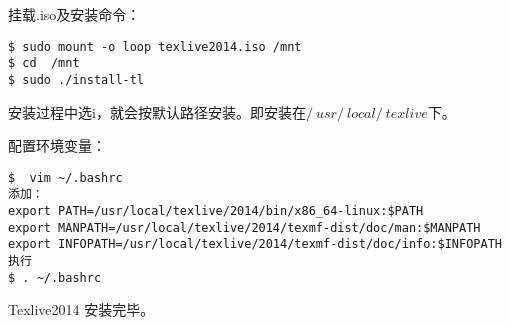 \documentclass[UTF8]{ctexart}
\numberwithin{equation}{section}
\numberwithin{figure}{section}
\numberwithin{table}{section}
\begin{document}
\noindent\Large{挂载.iso及安装命令：}  
\normalsize{\color{blue}\begin{verbatim}
$ sudo mount -o loop texlive2014.iso /mnt 
$ cd  /mnt
$ sudo ./install-tl
\end{verbatim}}
安装过程中选i，就会按默认路径安装。即安装在$/\ usr/\ local/\ texlive$下。

\Large{配置环境变量：}  
\normalsize{\color{blue}\begin{verbatim}
$  vim ~/.bashrc 
添加：
export PATH=/usr/local/texlive/2014/bin/x86_64-linux:$PATH
export MANPATH=/usr/local/texlive/2014/texmf-dist/doc/man:$MANPATH
export INFOPATH=/usr/local/texlive/2014/texmf-dist/doc/info:$INFOPATH
执行
$ . ~/.bashrc
\end{verbatim}}
Texlive2014 安装完毕。
\end{document}

